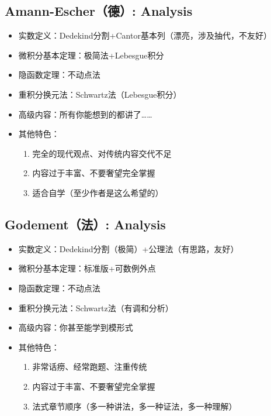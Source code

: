 \documentclass[UTF8]{article}
\begin{document}
    \subsection{Amann-Escher（德）: Analysis}
    \begin{itemize}
        \item 实数定义：Dedekind分割+Cantor基本列（漂亮，涉及抽代，不友好）
        \item 微积分基本定理：极简法+Lebesgue积分
        \item 隐函数定理：不动点法
        \item 重积分换元法：Schwartz法（Lebesgue积分）
        \item 高级内容：所有你能想到的都讲了\dots\dots
        \item 其他特色：\begin{enumerate}
            \item 完全的现代观点、对传统内容交代不足
            \item 内容过于丰富、不要奢望完全掌握
            \item 适合自学（至少作者是这么希望的）
        \end{enumerate}
    \end{itemize}
    \subsection{Godement（法）: Analysis}
    \begin{itemize}
        \item 实数定义：Dedekind分割（极简）+公理法（有思路，友好）
        \item 微积分基本定理：标准版+可数例外点
        \item 隐函数定理：不动点法
        \item 重积分换元法：Schwartz法（有调和分析）
        \item 高级内容：你甚至能学到模形式
        \item 其他特色：\begin{enumerate}
            \item 非常话痨、经常跑题、注重传统
            \item 内容过于丰富、不要奢望完全掌握
            \item 法式章节顺序（多一种讲法，多一种证法，多一种理解）
        \end{enumerate}
    \end{itemize}
\end{document}
